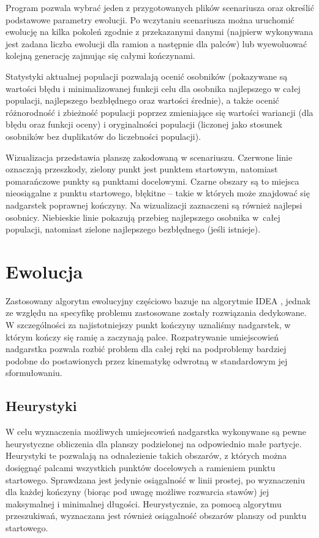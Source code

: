 \documentclass[11pt, leqno]{article}
\begin{document}
Program pozwala wybrać jeden z przygotowanych plików scenariusza oraz określić podstawowe parametry ewolucji. Po wczytaniu scenariusza można uruchomić ewolucję na kilka pokoleń zgodnie z przekazanymi danymi (najpierw wykonywana jest zadana liczba ewolucji dla ramion a następnie dla palców) lub wyewoluować kolejną generację zajmując się całymi kończynami.

Statystyki aktualnej populacji pozwalają ocenić osobników (pokazywane są wartości błędu i minimalizowanej funkcji celu dla osobnika najlepszego w całej populacji, najlepszego bezbłędnego oraz wartości średnie), a także ocenić różnorodność i zbieżność populacji poprzez zmieniające się wartości wariancji (dla błędu oraz funkcji oceny) i oryginalności populacji (liczonej jako stosunek osobników bez duplikatów do liczebności populacji).

Wizualizacja przedstawia planszę zakodowaną w scenariuszu. Czerwone linie oznaczają przeszkody, zielony punkt jest punktem startowym, natomiast pomarańczowe punkty są punktami docelowymi. Czarne obszary są to miejsca nieosiągalne z punktu startowego, błękitne -- takie w których może znajdować się nadgarstek poprawnej kończyny. Na wizualizacji zaznaczeni są również najlepsi osobnicy. Niebieskie linie pokazują przebieg najlepszego osobnika w~całej populacji, natomiast zielone najlepszego bezbłędnego (jeśli istnieje).

\section{Ewolucja}
Zastosowany algorytm ewolucyjny częściowo bazuje na algorytmie IDEA \cite{PFI}, jednak ze względu na specyfikę problemu zastosowane zostały rozwiązania dedykowane. W szczególności za najistotniejszy punkt kończyny uznaliśmy nadgarstek, w którym kończy się ramię a zaczynają palce. Rozpatrywanie umiejscowień nadgarstka pozwala rozbić problem dla całej ręki na podproblemy bardziej podobne do postawionych przez kinematykę odwrotną w standardowym jej sformułowaniu. 

\subsection{Heurystyki}
W celu wyznaczenia możliwych umiejscowień nadgarstka wykonywane są pewne heurystyczne obliczenia dla planszy podzielonej na odpowiednio małe partycje. Heurystyki te pozwalają na odnalezienie takich obszarów, z których można dosięgnąć palcami wszystkich punktów docelowych a ramieniem punktu startowego. Sprawdzana jest jedynie osiągalność w linii prostej, po wyznaczeniu dla każdej kończyny (biorąc pod uwagę możliwe rozwarcia stawów) jej maksymalnej i minimalnej długości. Heurystycznie, za pomocą algorytmu przeszukiwań, wyznaczana jest również osiągalność obszarów planszy od punktu startowego.
\end{document}
